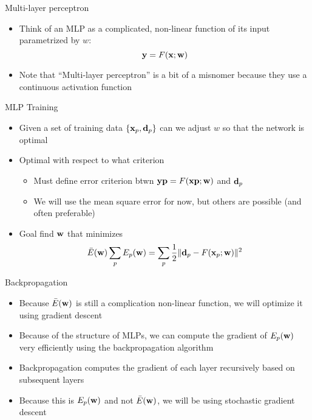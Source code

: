 \documentclass[notes]{beamer}
\providecommand{\tightlist}{%
  \setlength{\itemsep}{0pt}\setlength{\parskip}{0pt}}
\begin{document}
\begin{frame}{Multi-layer perceptron}

\begin{itemize}
\tightlist
\item
  Think of an MLP as a complicated, non-linear function of its input
  parametrized by \(w\): \[\mathbf{y}=F(\mathbf{x};\mathbf{w})\]
\item
  Note that ``Multi-layer perceptron'' is a bit of a misnomer because
  they use a continuous activation function
\end{itemize}

\end{frame}

\begin{frame}{MLP Training}

\begin{itemize}
\tightlist
\item
  Given a set of training data \(\{\mathbf{x}_p,\mathbf{d}_p\}\) can we adjust \(w\)
  so that the network is optimal
\item
  Optimal with respect to what criterion

  \begin{itemize}
  \tightlist
  \item
    Must define error criterion btwn \(\mathbf{y} \mathbf{p} = F(\mathbf{x}\mathbf{p} ; \mathbf{w})\) and
    \(\mathbf{d}_p\)
  \item
    We will use the mean square error for now, but others are possible
    (and often preferable)
  \end{itemize}
\item
  Goal find \(\mathbf{w}\) that minimizes
  \[  \bar{E}(\mathbf{w}) \sum_p E_p(\mathbf{w}) = \sum_p \frac{1}{2} \|\mathbf{d}_p - F(\mathbf{x}_p ;\mathbf{w})\|^2\]
\end{itemize}

\end{frame}

\begin{frame}{Backpropagation}

\begin{itemize}
\tightlist
\item
  Because \(\bar{E} (\mathbf{w})\) is still a complication non-linear function,
  we will optimize it using gradient descent
\item
  Because of the structure of MLPs, we can compute the gradient of
  \(E_p (\mathbf{w})\) very efficiently using the backpropagation algorithm
\item
  Backpropagation computes the gradient of each layer recursively based
  on subsequent layers
\item
  Because this is \(E_p (\mathbf{w})\) and not \(\bar{E} (\mathbf{w})\), we will be
  using stochastic gradient descent
\end{itemize}

\end{frame}
\end{document}
